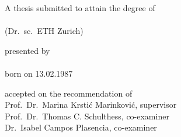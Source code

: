 \begin{titlepage}
    \begin{center}
        \large
        \begingroup
        \endgroup

        \hfill

        \vfill

        \begingroup
            \spacedallcaps{\myTitle}
        \endgroup

        \vfill

        \begingroup
            A thesis submitted to attain the degree of \\ %
            \vspace{1em}
             \\
            (Dr.\ sc.\ ETH Zurich)
        \endgroup

        \vfill

        \begingroup
            presented by\\
            \vspace{2.5em}
            \spacedlowsmallcaps{\myName} \\
            \vspace{2.5em}
            born on 13.02.1987 %
        \endgroup

        \vfill

        \begingroup
            accepted on the recommendation of \\
            \vspace{1em}
            Prof.\ Dr.\ Marina Krstić Marinković, supervisor \\
            Prof.\ Dr.\ Thomas C. Schulthess, co-examiner \\
            Dr.\ Isabel Campos Plasencia, co-examiner \\
        \endgroup

        \vfill

        \myTime%

        \vfill
    \end{center}
\end{titlepage}

